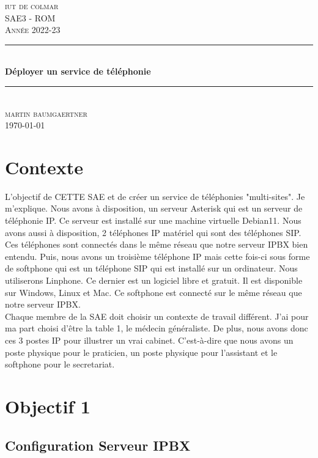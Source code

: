 \documentclass[12pt, a4paper]{article}
\begin{document}
\begin{titlepage}
	\newcommand{\HRule}{\rule{\linewidth}{0.5mm}} 
	\center 
	\textsc{\LARGE iut de colmar}\\[6.5cm] 
	\textsc{\Large SAE3 - ROM}\\[0.5cm] 
	\textsc{\large Année 2022-23}\\[0.5cm]
	\HRule\\[0.75cm]
	{\huge\bfseries Déployer un service de téléphonie}\\[0.4cm]
	\HRule\\[1.5cm]
	\textsc{\large martin baumgaertner}\\[6.5cm] 

	\vfill\vfill\vfill
	{\large\today} 
	\vfill
\end{titlepage}
\newpage
\tableofcontents
\newpage
\section*{Contexte}
L'objectif de CETTE SAE et de créer un service de téléphonies "multi-sites". Je
m'explique. Nous avons à disposition, un serveur Asterisk qui est un serveur de
téléphonie IP. Ce serveur est installé sur une machine virtuelle Debian11. Nous
avons aussi à disposition, 2 téléphones IP matériel qui sont des téléphones SIP. Ces
téléphones sont connectés dans le même réseau que notre serveur IPBX bien entendu. 
Puis, nous avons un troisième téléphone IP mais cette fois-ci sous forme de softphone
qui est un téléphone SIP qui est installé sur un ordinateur. Nous utiliserons 
Linphone. Ce dernier est un logiciel libre et gratuit. Il est disponible sur
Windows, Linux et Mac. Ce softphone est connecté sur le même réseau que notre serveur
IPBX.\\

Chaque membre de la SAE doit choisir un contexte de travail différent. J'ai pour
ma part choisi d'être la table 1, le médecin généraliste. De plus, nous 
avons donc ces 3 postes IP pour illustrer un vrai cabinet. C'est-à-dire que nous
avons un poste physique pour le praticien, un poste physique pour l'assistant et
le softphone pour le secretariat.\\

\section{Objectif 1}
\subsection{Configuration Serveur IPBX}
\end{document}
